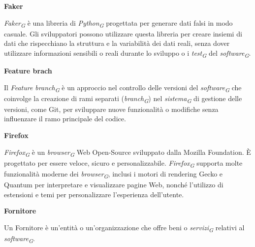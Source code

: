\documentclass{article}
\begin{document}
\vspace{0.4cm}

\textbf{Faker}

\vspace{0.1cm}

\textit{Faker}\textsubscript{\textit{G}} è una libreria di \textit{Python}\textsubscript{\textit{G}} progettata per generare dati falsi in modo casuale. Gli sviluppatori possono utilizzare questa libreria per creare insiemi di dati che rispecchiano la struttura e la variabilità dei dati reali, senza dover utilizzare informazioni sensibili o reali durante lo sviluppo o i \textit{test}\textsubscript{\textit{G}} del \textit{software}\textsubscript{\textit{G}}.

\vspace{0.4cm}

\textbf{Feature brach}

\vspace{0.1cm}

Il \textit{Feature branch}\textsubscript{\textit{G}} è un approccio nel controllo delle versioni del \textit{software}\textsubscript{\textit{G}} che coinvolge la creazione di rami separati (\textit{branch}\textsubscript{\textit{G}}) nel \textit{sistema}\textsubscript{\textit{G}} di gestione delle versioni, come Git, per sviluppare nuove funzionalità o modifiche senza influenzare il ramo principale del codice.

\vspace{0.4cm}

\textbf{Firefox}

\vspace{0.1cm}

\textit{Firefox}\textsubscript{\textit{G}} è un \textit{browser}\textsubscript{\textit{G}} Web Open-Source sviluppato dalla Mozilla Foundation. È progettato per essere veloce, sicuro e personalizzabile. \textit{Firefox}\textsubscript{\textit{G}} supporta molte funzionalità moderne dei \textit{browser}\textsubscript{\textit{G}}, inclusi i motori di rendering Gecko e Quantum per interpretare e visualizzare pagine Web, nonché l'utilizzo di estensioni e temi per personalizzare l'esperienza dell'utente. 

\vspace{0.4cm}

\textbf{Fornitore}

\vspace{0.1cm}

Un Fornitore è un'entità o un'organizzazione che offre beni o \textit{servizi}\textsubscript{\textit{G}} relativi al \textit{software}\textsubscript{\textit{G}}.
\end{document}

